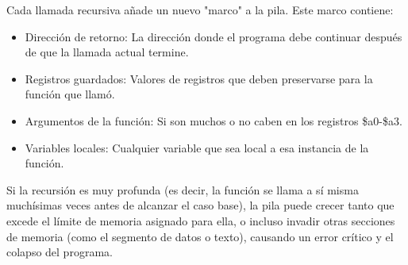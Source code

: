 \documentclass{article}
\begin{document}
Cada llamada recursiva añade un nuevo "marco" a la pila. Este marco contiene:
\begin{itemize}
    \item Dirección de retorno: La dirección donde el programa debe continuar después de que la llamada actual termine.
    \item Registros guardados: Valores de registros que deben preservarse para la función que llamó.
    \item Argumentos de la función: Si son muchos o no caben en los registros \$a0-\$a3.
    \item Variables locales: Cualquier variable que sea local a esa instancia de la función.
\end{itemize}
Si la recursión es muy profunda (es decir, la función se llama a sí misma muchísimas veces antes de alcanzar el caso base), la pila puede crecer tanto que excede el límite de memoria asignado para ella, o incluso invadir otras secciones de memoria (como el segmento de datos o texto), causando un error crítico y el colapso del programa.
\end{document}
